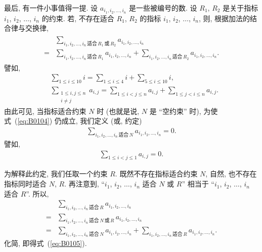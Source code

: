 \documentclass[%
    UTF8,%
    fontset=none,%
    punct=kaiming,%
    zihao=-4,%
    a4paper,%
    oneside,%
]{ctexbook}
\let\emph\relax
\renewcommand*{\leq}{\leqslant}
\begin{document}
最后, 有一件小事值得一提.
设 \(a_{i_1, i_2, \dots, i_n}\) 是一些被编号的数.
设 \(R_1\), \(R_2\)
是关于指标 \(i_1\), \(i_2\), \(\dots\), \(i_n\) 的约束.
若, 不存在\emph{同时}适合 \(R_1\), \(R_2\)
的指标 \(i_1\), \(i_2\), \(\dots\), \(i_n\),
则, 根据加法的结合律与交换律,
\begin{align}
    \begin{aligned}
             & \sum_{i_1,i_2,\dots,i_n
            \,\text{适合}\,R_1\,\text{或}\,R_2}
        {a_{i_1, i_2, \dots, i_n}}
        \\
        = {} & \sum_{i_1,i_2,\dots,i_n\,\text{适合}\,R_1}
        {a_{i_1, i_2, \dots, i_n}}
        + \sum_{i_1,i_2,\dots,i_n\,\text{适合}\,R_2}
        {a_{i_1, i_2, \dots, i_n}}.
    \end{aligned}
    \label{eq:B0104}
\end{align}
譬如,
\begin{align*}
     & \sum_{1 \leq i \leq 10} {i}
    = \sum_{1 \leq i \leq 4} {i}
    + \sum_{5 \leq i \leq 10} {i},
    \\
     & \sum_{\substack{1 \leq i, j \leq n \\i \neq j}} {a_{i,j}}
    = \sum_{1 \leq i < j \leq n} {a_{i,j}}
    + \sum_{1 \leq j < i \leq n} {a_{i,j}}.
\end{align*}
由此可见, 当\emph{不存在}指标适合约束 \(N\) 时
(也就是说, \(N\) 是 ``空约束'' 时),
为使式~(\ref{eq:B0104}) 仍成立,
我们定义 (或, 约定)
\begin{align}
    \sum_{i_1,i_2,\dots,i_n\,\text{适合}\,N}
    {a_{i_1, i_2, \dots, i_n}} = 0.
    \label{eq:B0105}
\end{align}
譬如,
\begin{align*}
    \sum_{1 \leq i < j \leq 1} {a_{i,j}} = 0.
\end{align*}

为解释此约定, 我们任取一个约束 \(R\).
既然不存在指标适合约束 \(N\),
自然, 也不存在指标同时适合 \(N\), \(R\).
再注意到,
``\(i_1\), \(i_2\), \(\dots\), \(i_n\)
适合 \(N\) 或 \(R\)''
相当于
``\(i_1\), \(i_2\), \(\dots\), \(i_n\)
适合 \(R\)''.
所以,
\begin{align*}
         &
    \sum_{i_1,i_2,\dots,i_n\,\text{适合}\,R}
    {a_{i_1, i_2, \dots, i_n}}
    \\
    = {} &
    \sum_{i_1,i_2,\dots,i_n\,\text{适合}\,N\,\text{或}\,R}
    {a_{i_1, i_2, \dots, i_n}}
    \\
    = {} &
    \sum_{i_1,i_2,\dots,i_n\,\text{适合}\,N}
    {a_{i_1, i_2, \dots, i_n}}
    + \sum_{i_1,i_2,\dots,i_n\,\text{适合}\,R}
    {a_{i_1, i_2, \dots, i_n}}.
\end{align*}
化简, 即得式~(\ref{eq:B0105}).
\end{document}
